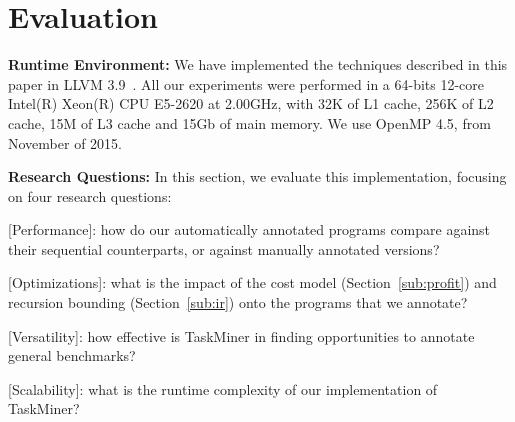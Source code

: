 \documentclass[sigplan,10pt,review,anonymous]{acmart}
\newcommand\Taskminer{\mbox{\textsf{TaskMiner}}}
\begin{document}
\section{Evaluation}
\label{sec:eval}



\noindent
\textbf{Runtime Environment:}
We have implemented the techniques described in this paper in
LLVM 3.9~\cite{Lattner04}.
All our experiments were performed in a 64-bits 12-core Intel(R) Xeon(R) CPU
E5-2620 at 2.00GHz, with 32K of L1 cache, 256K of L2 cache, 15M of L3 cache and
15Gb of main memory.
We use OpenMP 4.5, from November of 2015.

\noindent
\textbf{Research Questions:}
In this section, we evaluate this implementation, focusing on four research
questions:
%
\begin{compactitem}
\item \textsf{[Performance]}: how do our automatically annotated programs
compare against their sequential counterparts, or against manually annotated
versions?
\item \textsf{[Optimizations]}: what is the impact of the cost model
(Section~\ref{sub:profit}) and recursion bounding (Section~\ref{sub:ir}) onto
the programs that we annotate?
\item \textsf{[Versatility]}: how effective is \Taskminer{} in finding
opportunities to annotate general benchmarks?
\item \textsf{[Scalability]}: what is the runtime complexity of our
implementation of \Taskminer?
\end{compactitem}
\end{document}
